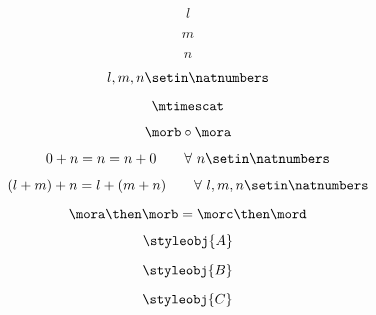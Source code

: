 {\begin{forslides}
        \begin{equation}
            \label{eq:38}
            l
        \end{equation}

        \begin{equation}
            \label{eq:39}
            m
        \end{equation}

        \begin{equation}
            \label{eq:40}
            n
        \end{equation}

        \begin{equation}
            \label{eq:41}
            l, m, n \setin \natnumbers
        \end{equation}

        \begin{equation}
            \label{eq:42}
            \mtimescat
        \end{equation}

        \begin{equation}
            \label{eq:43}
            \morb \circ \mora
        \end{equation}

        \begin{equation}
            \label{eq:44}
            0 + n = n = n + 0   \quad \quad \forall \ n \setin \natnumbers
        \end{equation}

        \begin{equation}
            \label{eq:45}
            (l + m) + n = l + (m + n) \quad \quad  \forall \ l, m, n \setin \natnumbers
        \end{equation}

        \begin{equation}
            \label{eq:46}
            \mora \then \morb = \morc \then \mord
        \end{equation}

        \begin{equation}
            \label{eq:47}
            \styleobj{A}
        \end{equation}

        \begin{equation}
            \label{eq:48}
            \styleobj{B}
        \end{equation}

        \begin{equation}
            \label{eq:49}
            \styleobj{C}
        \end{equation}


\end{forslides}}
